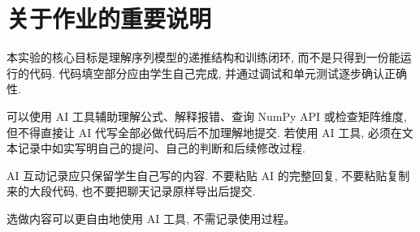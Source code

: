 \documentclass{../../nndlcourse}
\begin{document}
\section{关于作业的重要说明}

本实验的核心目标是理解序列模型的递推结构和训练闭环, 而不是只得到一份能运行的代码. 代码填空部分应由学生自己完成, 并通过调试和单元测试逐步确认正确性.

可以使用 AI 工具辅助理解公式、解释报错、查询 NumPy API 或检查矩阵维度, 但不得直接让 AI 代写全部必做代码后不加理解地提交. 若使用 AI 工具, 必须在文本记录中如实写明自己的提问、自己的判断和后续修改过程.

AI 互动记录应只保留学生自己写的内容. 不要粘贴 AI 的完整回复, 不要粘贴复制来的大段代码, 也不要把聊天记录原样导出后提交.

选做内容可以更自由地使用 AI 工具, 不需记录使用过程。
\end{document}
